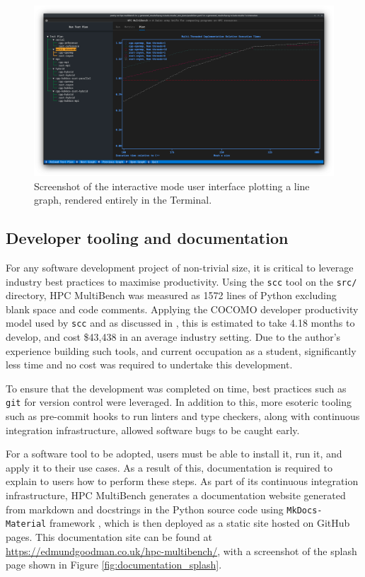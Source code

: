 \begin{figure}[H]
    \centering
    \includegraphics[width=\textwidth]{images/4_tooling/interactive_screenshots/hpc-multibench-line-plotext-2.png}
    \caption{Screenshot of the interactive mode user interface plotting a line graph, rendered entirely in the Terminal.}
    \label{fig:hpc-multibench-line-plotext-2}
\end{figure}

\subsection{Developer tooling and documentation}
\label{ssec:hpc-multibench-developer-tooling-documentation}

For any software development project of non-trivial size, it is critical to leverage industry best practices to maximise productivity. Using the \texttt{scc} \cite{boyterBoyterScc2024} tool on the \texttt{src/} directory, HPC MultiBench was measured as 1572 lines of Python excluding blank space and code comments. Applying the COCOMO developer productivity model used by \texttt{scc} and as discussed in , this is estimated to take 4.18 months to develop, and cost \$43,438 in an average industry setting. Due to the author's experience building such tools, and current occupation as a student, significantly less time and no cost was required to undertake this development.

To ensure that the development was completed on time, best practices such as \texttt{git} for version control were leveraged. In addition to this, more esoteric tooling such as pre-commit hooks to run linters and type checkers, along with continuous integration infrastructure, allowed software bugs to be caught early.

For a software tool to be adopted, users must be able to install it, run it, and apply it to their use cases. As a result of this, documentation is required to explain to users how to perform these steps. As part of its continuous integration infrastructure, HPC MultiBench generates a documentation website generated from markdown and docstrings in the Python source code using \texttt{MkDocs-Material} framework \cite{donathSquidfunkMkdocsmaterial2024}, which is then deployed as a static site hosted on GitHub pages. This documentation site can be found at \url{https://edmundgoodman.co.uk/hpc-multibench/}, with a screenshot of the splash page shown in Figure \ref{fig:documentation_splash}.

